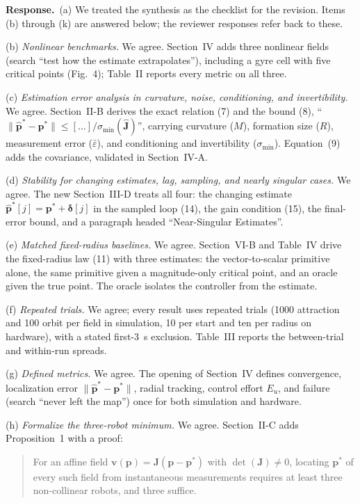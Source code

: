 \documentclass[10pt]{article}
\newcommand{\rev}[1]{#1}                             %
\newcommand{\resp}{\par\textbf{Response.}~}
\newenvironment{newtext}{\begin{quote}\small\sloppy}{\end{quote}}
\begin{document}
\resp (a) We treated the synthesis as the checklist for the revision. Items (b) through (k) are answered below; the reviewer responses refer back to these.

(b) \emph{Nonlinear benchmarks.} We agree. Section~IV adds three nonlinear fields (search ``test how the estimate extrapolates''), including a gyre cell with five critical points (Fig.~4); Table~II reports every metric on all three.

(c) \emph{Estimation error analysis in curvature, noise, conditioning, and invertibility.} We agree. Section~II-B derives the exact relation (7) and the bound (8), ``$\|\hat{\mathbf{p}}^* - \mathbf{p}^*\| \le [\ldots]/\sigma_{\min}(\hat{\mathbf{J}})$'', carrying curvature ($M$), formation size ($R$), measurement error ($\bar\varepsilon$), and conditioning and invertibility ($\sigma_{\min}$). Equation~(9) adds the covariance, validated in Section~IV-A.

(d) \emph{Stability for changing estimates, lag, sampling, and nearly singular cases.} We agree. The new Section~III-D treats all four: the changing estimate $\hat{\mathbf{p}}^*[j] = \mathbf{p}^* + \boldsymbol\delta[j]$ in the sampled loop (14), the gain condition (15), the final-error bound, and a paragraph headed ``Near-Singular Estimates''.

(e) \emph{Matched fixed-radius baselines.} We agree. Section~VI-B and Table~IV drive the fixed-radius law (11) with three estimates: the vector-to-scalar primitive alone, the same primitive given a magnitude-only critical point, and an oracle given the true point. The oracle isolates the controller from the estimate.

(f) \emph{Repeated trials.} We agree; every result uses repeated trials (1000 attraction and \rev{100} orbit per field in simulation, 10 per start and \rev{ten} per radius on hardware), with a stated first-\rev{3}~s exclusion. Table~III reports the between-trial and within-run spreads.

(g) \emph{Defined metrics.} We agree. The opening of Section~IV defines convergence, localization error $\|\hat{\mathbf{p}}^* - \mathbf{p}^*\|$, radial tracking, control effort $E_u$, and failure (search ``never left the map'') once for both simulation and hardware.

(h) \emph{Formalize the three-robot minimum.} We agree. Section~II-C adds Proposition~1 with a proof:
\begin{newtext}
For an affine field $\mathbf{v}(\mathbf{p}) = \mathbf{J}(\mathbf{p}-\mathbf{p}^*)$ with $\det(\mathbf{J}) \neq 0$, locating $\mathbf{p}^*$ of every such field from instantaneous measurements requires at least three non-collinear robots, and three suffice.
\end{newtext}
\end{document}
